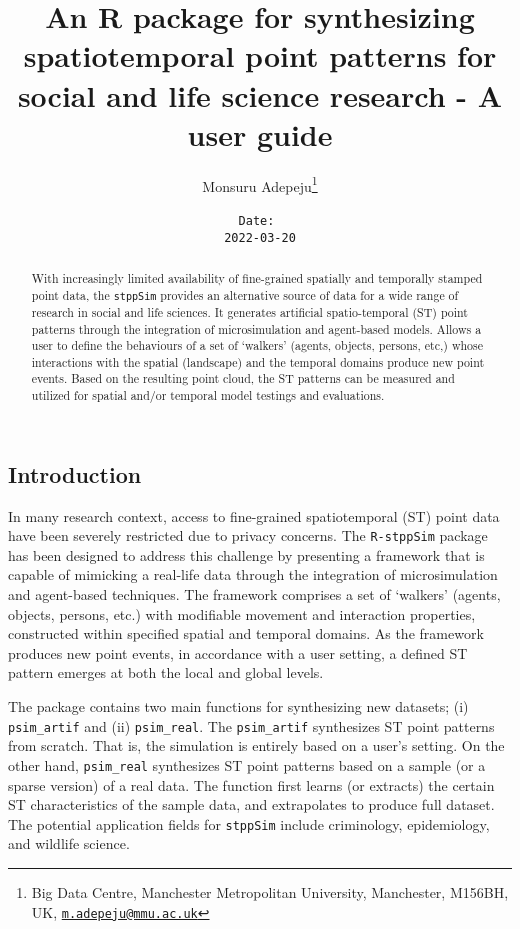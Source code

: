 \documentclass[
  16pt,
]{article}
\title{An R package for synthesizing spatiotemporal point patterns for
social and life science research - A user guide}
\author{Monsuru Adepeju\footnote{Big Data Centre, Manchester
  Metropolitan University, Manchester, M156BH, UK,
  \href{mailto:m.adepeju@mmu.ac.uk}{\nolinkurl{m.adepeju@mmu.ac.uk}}}}
\date{\texttt{Date:}~\\
\texttt{2022-03-20}}
\begin{document}
\maketitle
\begin{abstract}
With increasingly limited availability of fine-grained spatially and
temporally stamped point data, the \texttt{stppSim} provides an
alternative source of data for a wide range of research in social and
life sciences. It generates artificial spatio-temporal (ST) point
patterns through the integration of microsimulation and agent-based
models. Allows a user to define the behaviours of a set of `walkers'
(agents, objects, persons, etc,) whose interactions with the spatial
(landscape) and the temporal domains produce new point events. Based on
the resulting point cloud, the ST patterns can be measured and utilized
for spatial and/or temporal model testings and evaluations.
\end{abstract}

{
\hypersetup{linkcolor=}
\setcounter{tocdepth}{3}
\tableofcontents
}
\hypertarget{introduction}{%
\subsection{Introduction}\label{introduction}}

In many research context, access to fine-grained spatiotemporal (ST)
point data have been severely restricted due to privacy concerns. The
\texttt{R-stppSim} package has been designed to address this challenge
by presenting a framework that is capable of mimicking a real-life data
through the integration of microsimulation and agent-based techniques.
The framework comprises a set of `walkers' (agents, objects, persons,
etc.) with modifiable movement and interaction properties, constructed
within specified spatial and temporal domains. As the framework produces
new point events, in accordance with a user setting, a defined ST
pattern emerges at both the local and global levels.

The package contains two main functions for synthesizing new datasets;
(i) \texttt{psim\_artif} and (ii) \texttt{psim\_real}. The
\texttt{psim\_artif} synthesizes ST point patterns from scratch. That
is, the simulation is entirely based on a user's setting. On the other
hand, \texttt{psim\_real} synthesizes ST point patterns based on a
sample (or a sparse version) of a real data. The function first learns
(or extracts) the certain ST characteristics of the sample data, and
extrapolates to produce full dataset. The potential application fields
for \texttt{stppSim} include criminology, epidemiology, and wildlife
science.
\end{document}
